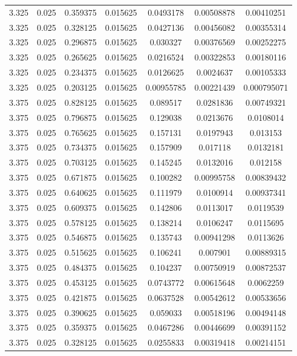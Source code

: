 \begin{flushleft}
\begin{longtable}{ccccccc}
3.325 & 0.025 & 0.359375 & 0.015625 & 0.0493178 & 0.00508878 & 0.00410251  \\ 
3.325 & 0.025 & 0.328125 & 0.015625 & 0.0427136 & 0.00456082 & 0.00355314  \\ 
3.325 & 0.025 & 0.296875 & 0.015625 & 0.030327 & 0.00376569 & 0.00252275  \\ 
3.325 & 0.025 & 0.265625 & 0.015625 & 0.0216524 & 0.00322853 & 0.00180116  \\ 
3.325 & 0.025 & 0.234375 & 0.015625 & 0.0126625 & 0.0024637 & 0.00105333  \\ 
3.325 & 0.025 & 0.203125 & 0.015625 & 0.00955785 & 0.00221439 & 0.000795071  \\ 
3.375 & 0.025 & 0.828125 & 0.015625 & 0.089517 & 0.0281836 & 0.00749321  \\ 
3.375 & 0.025 & 0.796875 & 0.015625 & 0.129038 & 0.0213676 & 0.0108014  \\ 
3.375 & 0.025 & 0.765625 & 0.015625 & 0.157131 & 0.0197943 & 0.013153  \\ 
3.375 & 0.025 & 0.734375 & 0.015625 & 0.157909 & 0.017118 & 0.0132181  \\ 
3.375 & 0.025 & 0.703125 & 0.015625 & 0.145245 & 0.0132016 & 0.012158  \\ 
3.375 & 0.025 & 0.671875 & 0.015625 & 0.100282 & 0.00995758 & 0.00839432  \\ 
3.375 & 0.025 & 0.640625 & 0.015625 & 0.111979 & 0.0100914 & 0.00937341  \\ 
3.375 & 0.025 & 0.609375 & 0.015625 & 0.142806 & 0.0113017 & 0.0119539  \\ 
3.375 & 0.025 & 0.578125 & 0.015625 & 0.138214 & 0.0106247 & 0.0115695  \\ 
3.375 & 0.025 & 0.546875 & 0.015625 & 0.135743 & 0.00941298 & 0.0113626  \\ 
3.375 & 0.025 & 0.515625 & 0.015625 & 0.106241 & 0.007901 & 0.00889315  \\ 
3.375 & 0.025 & 0.484375 & 0.015625 & 0.104237 & 0.00750919 & 0.00872537  \\ 
3.375 & 0.025 & 0.453125 & 0.015625 & 0.0743772 & 0.00615648 & 0.0062259  \\ 
3.375 & 0.025 & 0.421875 & 0.015625 & 0.0637528 & 0.00542612 & 0.00533656  \\ 
3.375 & 0.025 & 0.390625 & 0.015625 & 0.059033 & 0.00518196 & 0.00494148  \\ 
3.375 & 0.025 & 0.359375 & 0.015625 & 0.0467286 & 0.00446699 & 0.00391152  \\ 
3.375 & 0.025 & 0.328125 & 0.015625 & 0.0255833 & 0.00319418 & 0.00214151  \\ 

\end{longtable}
\end{flushleft}

